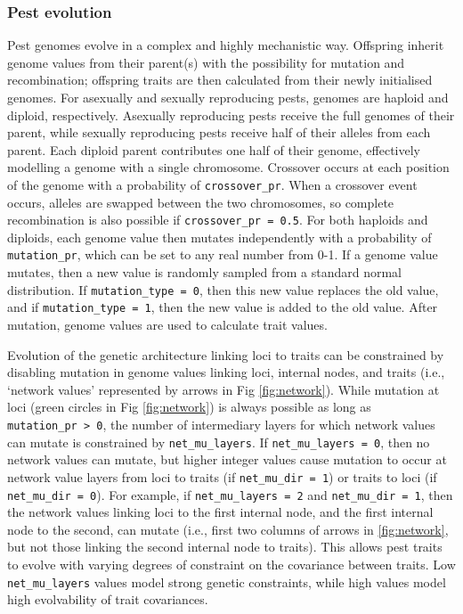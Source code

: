 \documentclass[
]{article}
\begin{document}
\hypertarget{evolution}{%
\subsubsection{Pest evolution}\label{evolution}}

Pest genomes evolve in a complex and highly mechanistic way.
Offspring inherit genome values from their parent(s) with the possibility for mutation and recombination; offspring traits are then calculated from their newly initialised genomes.
For asexually and sexually reproducing pests, genomes are haploid and diploid, respectively.
Asexually reproducing pests receive the full genomes of their parent, while sexually reproducing pests receive half of their alleles from each parent.
Each diploid parent contributes one half of their genome, effectively modelling a genome with a single chromosome.
Crossover occurs at each position of the genome with a probability of \texttt{crossover\_pr}.
When a crossover event occurs, alleles are swapped between the two chromosomes, so complete recombination is also possible if \texttt{crossover\_pr\ =\ 0.5}.
For both haploids and diploids, each genome value then mutates independently with a probability of \texttt{mutation\_pr}, which can be set to any real number from 0-1.
If a genome value mutates, then a new value is randomly sampled from a standard normal distribution.
If \texttt{mutation\_type\ =\ 0}, then this new value replaces the old value, and if \texttt{mutation\_type\ =\ 1}, then the new value is added to the old value.
After mutation, genome values are used to calculate trait values.

Evolution of the genetic architecture linking loci to traits can be constrained by disabling mutation in genome values linking loci, internal nodes, and traits (i.e., `network values' represented by arrows in Fig \ref{fig:network}).
While mutation at loci (green circles in Fig \ref{fig:network}) is always possible as long as \texttt{mutation\_pr\ \textgreater{}\ 0}, the number of intermediary layers for which network values can mutate is constrained by \texttt{net\_mu\_layers}.
If \texttt{net\_mu\_layers\ =\ 0}, then no network values can mutate, but higher integer values cause mutation to occur at network value layers from loci to traits (if \texttt{net\_mu\_dir\ =\ 1}) or traits to loci (if \texttt{net\_mu\_dir\ =\ 0}).
For example, if \texttt{net\_mu\_layers\ =\ 2} and \texttt{net\_mu\_dir\ =\ 1}, then the network values linking loci to the first internal node, and the first internal node to the second, can mutate (i.e., first two columns of arrows in \ref{fig:network}, but not those linking the second internal node to traits).
This allows pest traits to evolve with varying degrees of constraint on the covariance between traits.
Low \texttt{net\_mu\_layers} values model strong genetic constraints, while high values model high evolvability of trait covariances.
\end{document}
